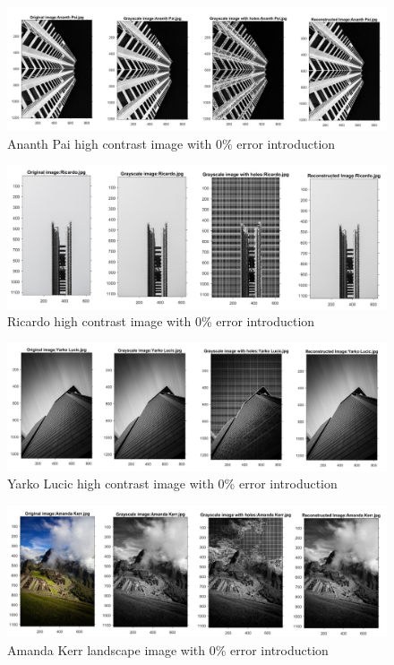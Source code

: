 \begin{figure}[!ht]
\center \includegraphics[scale=0.26]{AnanthPai.jpg}
\caption{Ananth Pai high contrast image with 0\% error introduction}
\label{fig:aphc}
\end{figure}

\begin{figure}[!ht]
\center \includegraphics[scale=0.315]{Ricardo.jpg}
\caption{Ricardo high contrast image with 0\% error introduction}
\label{fig:rhc}
\end{figure}

\begin{figure}[!ht]
\center \includegraphics[scale=0.28]{YarkoLucic.jpg}
\caption{Yarko Lucic high contrast image with 0\% error introduction}
\label{fig:ylhc}
\end{figure}

\begin{figure}[!ht]
\center \includegraphics[scale=0.3]{AmandaKerr.jpg}
\caption{Amanda Kerr landscape image with 0\% error introduction}
\label{fig:akl}
\end{figure}

